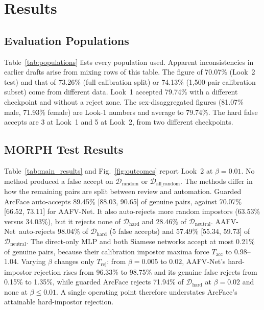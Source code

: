 \documentclass[journal]{IEEEtran}
\newcommand{\sys}{AAFV-Net}
\begin{document}
\section{Results}
\label{sec:results}



\subsection{Evaluation Populations}
Table~\ref{tab:populations} lists every population used. Apparent inconsistencies in earlier drafts arise from mixing rows of this table. The figure of 70.07\% (Look~2 test) and that of 73.26\% (full calibration split) or 74.13\% (1,500-pair calibration subset) come from different data. Look~1 accepted 79.74\% with a different checkpoint and without a reject zone. The sex-disaggregated figures (81.07\% male, 71.93\% female) are Look-1 numbers and average to 79.74\%. The hard false accepts are 3 at Look~1 and 5 at Look~2, from two different checkpoints.

\subsection{MORPH Test Results}

Table~\ref{tab:main_results} and Fig.~\ref{fig:outcomes} report Look~2 at $\beta=0.01$. No method produced a false accept on $\mathcal{D}_{\text{random}}$ or $\mathcal{D}_{\text{all\_random}}$. The methods differ in how the remaining pairs are split between review and automation. Guarded ArcFace auto-accepts 89.45\% [88.03, 90.65] of genuine pairs, against 70.07\% [66.52, 73.11] for \sys. It also auto-rejects more random impostors (63.53\% versus 34.03\%), but it rejects none of $\mathcal{D}_{\text{hard}}$ and 28.46\% of $\mathcal{D}_{\text{neutral}}$. \sys\ auto-rejects 98.04\% of $\mathcal{D}_{\text{hard}}$ (5 false accepts) and 57.49\% [55.34, 59.73] of $\mathcal{D}_{\text{neutral}}$. The direct-only MLP and both Siamese networks accept at most 0.21\% of genuine pairs, because their calibration impostor maxima force $T_{\text{acc}}$ to 0.98--1.04. Varying $\beta$ changes only $T_{\text{rej}}$: from $\beta=0.005$ to $0.02$, \sys's hard-impostor rejection rises from 96.33\% to 98.75\% and its genuine false rejects from 0.15\% to 1.35\%, while guarded ArcFace rejects 71.94\% of $\mathcal{D}_{\text{hard}}$ at $\beta=0.02$ and none at $\beta\le0.01$. A single operating point therefore understates ArcFace's attainable hard-impostor rejection.
\end{document}
